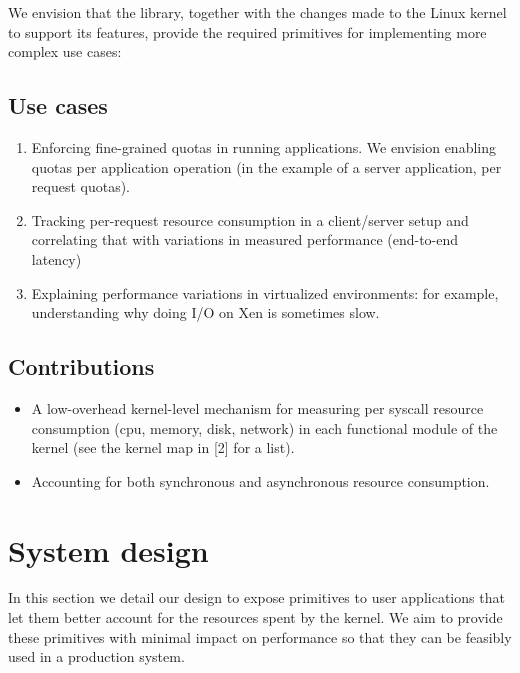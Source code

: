\documentclass[12pt]{article}
\begin{document}
We envision that the library, together with the changes made to the Linux kernel to support its features, provide the required primitives for implementing more complex use cases:

\subsection{Use cases}
\begin{enumerate}
\item Enforcing fine-grained quotas in running applications. We envision enabling quotas per application operation (in the example of a server application, per request quotas).
\item Tracking per-request resource consumption in a client/server setup and correlating that with variations in measured performance (end-to-end latency)
\item Explaining performance variations in virtualized environments: for example, understanding why doing I/O on Xen is sometimes slow.
\end{enumerate}


\subsection{Contributions}
\begin{itemize}
\item A low-overhead kernel-level mechanism for measuring per syscall resource consumption (cpu, memory, disk, network) in each functional module of the kernel (see the kernel map in [2] for a list).
\item Accounting for both synchronous and asynchronous resource consumption.
\end{itemize}


\section{System design}
 In this section we detail our design to expose primitives to user applications that let them better account for the resources spent by the kernel. We aim to provide these primitives with minimal impact on performance so that they can be feasibly used in a production system.
\end{document}

